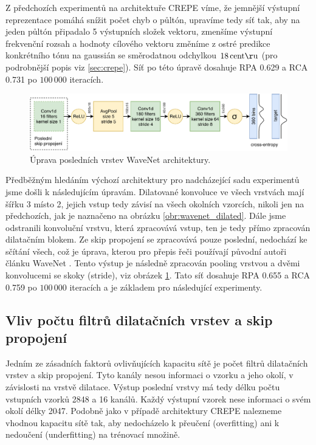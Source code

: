 Z předchozích experimentů na architektuře CREPE víme, že jemnější výstupní reprezentace pomáhá snížit počet chyb o půltón, upravíme tedy síť tak, aby na jeden půltón připadalo 5 výstupních složek vektoru, zmenšíme výstupní frekvenční rozsah a hodnoty cílového vektoru změníme z ostré predikce konkrétního tónu na  gaussián se směrodatnou odchylkou $18\,\rm centů$ (pro podrobnější popis viz \ref{sec:crepe}). Síť po této úpravě dosahuje RPA 0.629 a RCA 0.731 po $100\,000$ iteracích. 

\begin{figure}[h]\centering
    \includegraphics[scale=0.8]{../img/wavenet_lastlayer}
    \caption{Úprava posledních vrstev WaveNet architektury.}\label{obr:wavenet_lastlayer}
\end{figure}

Předběžným hledáním výchozí architektury pro nadcházející sadu experimentů jsme došli k následujícím úpravám. Dilatované konvoluce ve všech vrstvách mají šířku 3 místo 2, jejich vstup tedy závisí na všech okolních vzorcích, nikoli jen na předchozích, jak je naznačeno na obrázku \ref{obr:wavenet_dilated}. Dále jsme odstranili konvoluční vrstvu, která zpracovává vstup, ten je tedy přímo zpracován dilatačním blokem. Ze skip propojení se zpracovává pouze poslední, nedochází ke sčítání všech, což je úprava, kterou pro přepis řeči používají původní autoři článku WaveNet \cite{Oord2016}. Tento výstup je následně zpracován pooling vrstvou a dvěmi konvolucemi se skoky (stride), viz obrázek \ref{obr:wavenet_lastlayer}. Tato síť dosahuje RPA 0.655 a RCA 0.759 po $100\,000$ iteracích a je základem pro následující experimenty.

\subsection{Vliv počtu filtrů dilatačních vrstev a skip propojení}

Jedním ze zásadních faktorů ovlivňujících kapacitu sítě je počet filtrů dilatačních vrstev a skip propojení. Tyto kanály nesou informaci o vzorku a jeho okolí, v závislosti na vrstvě dilatace. Výstup poslední vrstvy má tedy délku počtu vstupních vzorků 2848 a 16 kanálů. Každý výstupní vzorek nese informaci o svém okolí délky 2047. Podobně jako v případě architektury CREPE nalezneme vhodnou kapacitu sítě tak, aby nedocházelo k přeučení (overfitting) ani k nedoučení (underfitting) na trénovací množině.

